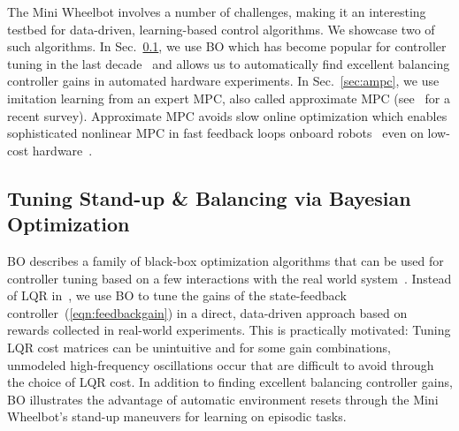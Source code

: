 The Mini Wheelbot involves a number of challenges, making it an interesting testbed for data-driven, learning-based control algorithms.
We showcase two of such algorithms.
In Sec.~\ref{sec:bo}, we use BO which has become popular for controller tuning in the last decade~\cite{chatzilygeroudis2019survey,paulson2023tutorial, marco2016automatic, calandra2016bayesian, berkenkamp2016safe} and allows us to automatically find excellent balancing controller gains in automated hardware experiments.
In Sec.~\ref{sec:ampc}, we use imitation learning from an expert MPC, also called approximate MPC (see~\cite{gonzalez2023neural} for a recent survey).
Approximate MPC avoids slow online optimization which enables sophisticated nonlinear MPC in fast feedback loops onboard robots~\cite{carius2020mpc,nubert2020safe} even on low-cost hardware~\cite{hose2024parameter}.

\subsection{Tuning Stand-up \& Balancing via Bayesian Optimization}
\label{sec:bo}
BO describes a family of black-box optimization algorithms that can be used for controller tuning based on a few interactions with the real world system~\cite{paulson2023tutorial, marco2016automatic, calandra2016bayesian, berkenkamp2016safe,chatzilygeroudis2019survey}. 
Instead of LQR in~\cite{geist2022wheelbot}, we use BO to tune the gains of the state-feedback controller~(\ref{eqn:feedbackgain}) in a direct, data-driven approach based on rewards collected in real-world experiments.
This is practically motivated: Tuning LQR cost matrices can be unintuitive and for some gain combinations, unmodeled high-frequency oscillations occur that are difficult to avoid through the choice of LQR cost.
In addition to finding excellent balancing controller gains, BO illustrates the advantage of automatic environment resets through the Mini Wheelbot's stand-up maneuvers for learning on episodic tasks.


